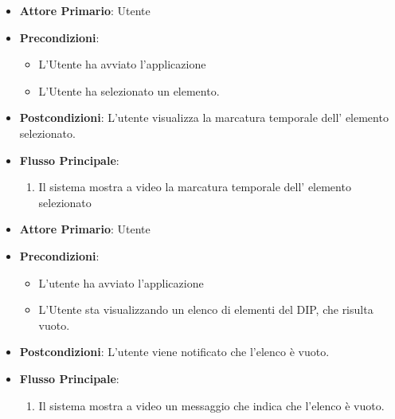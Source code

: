 \begin{itemize}
    \item \textbf{Attore Primario}: Utente
    \item \textbf{Precondizioni}: \begin{itemize}
        \item L'Utente ha avviato l'applicazione
        \item L'Utente ha selezionato un elemento.
    \end{itemize}
    \item \textbf{Postcondizioni}: L'utente visualizza la marcatura temporale dell' elemento selezionato.
    \item \textbf{Flusso Principale}:
    \begin{enumerate}
              \item Il sistema mostra a video la marcatura temporale dell' elemento selezionato
    \end{enumerate}
\end{itemize}


\begin{itemize}
    \item \textbf{Attore Primario}: Utente
    \item \textbf{Precondizioni}: \begin{itemize}
        \item L'utente ha avviato l'applicazione
        \item L'Utente sta visualizzando un elenco di elementi del DIP, che risulta vuoto.
    \end{itemize}
    \item \textbf{Postcondizioni}: L'utente viene notificato che l'elenco è vuoto.
    \item \textbf{Flusso Principale}: 
          \begin{enumerate}
              \item Il sistema mostra a video un messaggio che indica che l'elenco è vuoto.
          \end{enumerate}
\end{itemize}


